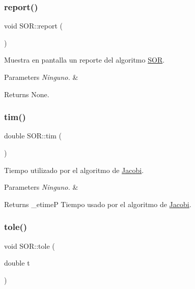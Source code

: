 \subsubsection{\texorpdfstring{report()}{report()}}
{\footnotesize\ttfamily void S\+O\+R\+::report (\begin{DoxyParamCaption}{ }\end{DoxyParamCaption})\hspace{0.3cm}{\ttfamily [inline]}}



Muestra en pantalla un reporte del algoritmo \hyperlink{class_s_o_r}{S\+OR}. 


\begin{DoxyParams}{Parameters}
{\em Ninguno.} & \\
\hline
\end{DoxyParams}
\begin{DoxyReturn}{Returns}
None. 
\end{DoxyReturn}
\hypertarget{class_s_o_r_aa592907de2e098a9f13de1ce08fdc00e}{}\label{class_s_o_r_aa592907de2e098a9f13de1ce08fdc00e} 
\subsubsection{\texorpdfstring{tim()}{tim()}}
{\footnotesize\ttfamily double S\+O\+R\+::tim (\begin{DoxyParamCaption}{ }\end{DoxyParamCaption})\hspace{0.3cm}{\ttfamily [inline]}}



Tiempo utilizado por el algoritmo de \hyperlink{class_jacobi}{Jacobi}. 


\begin{DoxyParams}{Parameters}
{\em Ninguno.} & \\
\hline
\end{DoxyParams}
\begin{DoxyReturn}{Returns}
\+\_\+etimeP Tiempo usado por el algoritmo de \hyperlink{class_jacobi}{Jacobi}. 
\end{DoxyReturn}
\hypertarget{class_s_o_r_a733204031026cfad302c9d1ced3b7cb5}{}\label{class_s_o_r_a733204031026cfad302c9d1ced3b7cb5} 
\subsubsection{\texorpdfstring{tole()}{tole()}}
{\footnotesize\ttfamily void S\+O\+R\+::tole (\begin{DoxyParamCaption}\item[{double}]{t }\end{DoxyParamCaption})\hspace{0.3cm}{\ttfamily [inline]}}



